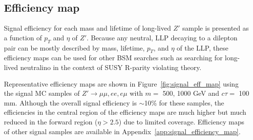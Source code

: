 \subsection{Efficiency map}
\label{sec:efficiency_map}
Signal efficiency for each mass and lifetime of long-lived $Z'$ sample is presented as a function of $p_{T}$ and $\eta$ of $Z'$. Because any neutral, LLP decaying to a dilepton pair can be mostly described by mass, lifetime, $p_{T}$, and $\eta$ of the LLP, these efficiency maps can be used for other BSM searches such as searching for long-lived neutralino in the context of SUSY R-parity violating theory.

Representative efficiency maps are shown in Figure~\ref{fig:signal_eff_map} using the signal MC samples of $Z' \rightarrow \mu\mu, ee, e\mu$ with $m=$ 500, 1000 GeV and $c\tau=$ 100 mm. Although the overall signal efficiency is $\sim$10\% for these samples, the efficiencies in the central region of the efficiency maps are much higher but much reduced in the forward region ($\eta > 2.5$) due to limited coverage. Efficiency maps of other signal samples are available in Appendix~\ref{app:signal_efficiency_map}.

